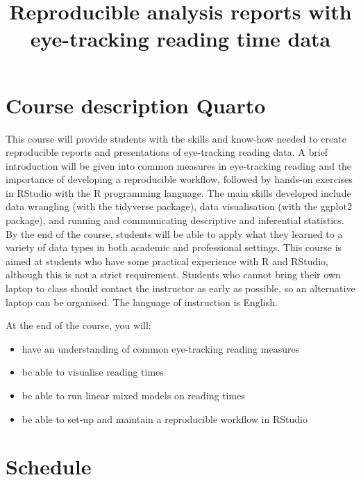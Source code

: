 \documentclass[
  letterpaper,
  DIV=11,
  numbers=noendperiod]{scrartcl}
\title{Reproducible analysis reports with eye-tracking reading time
data}
\author{}
\date{}
\providecommand{\tightlist}{%
  \setlength{\itemsep}{0pt}\setlength{\parskip}{0pt}}\usepackage{longtable,booktabs,array}
\begin{document}
\maketitle
\ifdefined\Shaded\renewenvironment{Shaded}{\begin{tcolorbox}[interior hidden, frame hidden, sharp corners, borderline west={3pt}{0pt}{shadecolor}, breakable, boxrule=0pt, enhanced]}{\end{tcolorbox}}\fi

\hypertarget{course-description-quarto}{%
\section{Course description Quarto}\label{course-description-quarto}}

This course will provide students with the skills and know-how needed to
create reproducible reports and presentations of eye-tracking reading
data. A brief introduction will be given into common measures in
eye-tracking reading and the importance of developing a reproducible
workflow, followed by hands-on exercises in RStudio with the R
programming language. The main skills developed include data wrangling
(with the tidyverse package), data visualisation (with the ggplot2
package), and running and communicating descriptive and inferential
statistics. By the end of the course, students will be able to apply
what they learned to a variety of data types in both academic and
professional settings. This course is aimed at students who have some
practical experience with R and RStudio, although this is not a strict
requirement. Students who cannot bring their own laptop to class should
contact the instructor as early as possible, so an alternative laptop
can be organised. The language of instruction is English.

At the end of the course, you will:

\begin{itemize}
\tightlist
\item
  have an understanding of common eye-tracking reading measures
\item
  be able to visualise reading times
\item
  be able to run linear mixed models on reading times
\item
  be able to set-up and maintain a reproducible workflow in RStudio
\end{itemize}

\hypertarget{schedule}{%
\section{Schedule}\label{schedule}}
\end{document}

